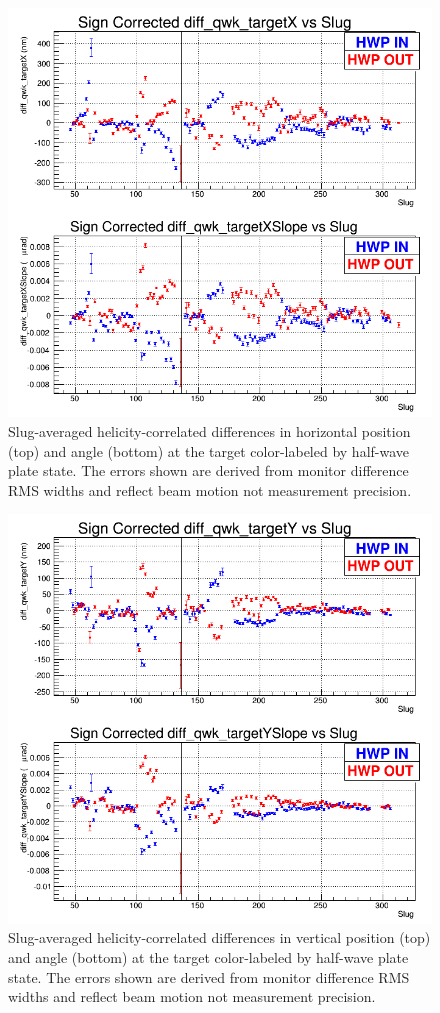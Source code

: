 \begin{figure}
\centering
\includegraphics[width=5.9in]{./Pictures/XDifferences_by_Slug.png}
\caption{\label{fig:Xdiff_by_slug}Slug-averaged helicity-correlated differences in horizontal position (top) and angle (bottom) at the target color-labeled by half-wave plate state. The errors shown are derived from monitor difference RMS widths and reflect beam motion not measurement precision.}
\end{figure}

\begin{figure}
\centering
\includegraphics[width=5.9in]{./Pictures/YDifferences_by_Slug.png}
\caption{\label{fig:Ydiff_by_slug}Slug-averaged helicity-correlated differences in vertical position (top) and angle (bottom) at the target color-labeled by half-wave plate state. The errors shown are derived from monitor difference RMS widths and reflect beam motion not measurement precision. }
\end{figure}

